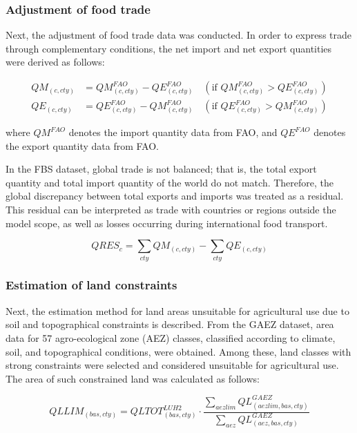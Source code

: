 \subsubsection{Adjustment of food trade}

Next, the adjustment of food trade data was conducted. 
In order to express trade through complementary conditions, 
the net import and net export quantities were derived as follows:

\begin{align}
QM_{(c,cty)} &= QM^{FAO}_{(c,cty)} - QE^{FAO}_{(c,cty)} 
\quad (\text{if } QM^{FAO}_{(c,cty)} > QE^{FAO}_{(c,cty)}) \\
QE_{(c,cty)} &= QE^{FAO}_{(c,cty)} - QM^{FAO}_{(c,cty)} 
\quad (\text{if } QE^{FAO}_{(c,cty)} > QM^{FAO}_{(c,cty)})
\end{align}

where \( QM^{FAO} \) denotes the import quantity data from FAO, 
and \( QE^{FAO} \) denotes the export quantity data from FAO.

In the FBS dataset, global trade is not balanced; 
that is, the total export quantity and total import quantity of the world do not match.  
Therefore, the global discrepancy between total exports and imports was treated as a residual.  
This residual can be interpreted as trade with countries or regions 
outside the model scope, as well as losses occurring during international food transport.

\begin{equation}
QRES_{c} = \sum_{cty} QM_{(c,cty)} - \sum_{cty} QE_{(c,cty)}
\end{equation}



\subsubsection{Estimation of land constraints}

Next, the estimation method for land areas unsuitable for agricultural use 
due to soil and topographical constraints is described.  
From the GAEZ dataset, area data for 57 agro-ecological zone (AEZ) classes, 
classified according to climate, soil, and topographical conditions, 
were obtained.  
Among these, land classes with strong constraints were selected 
and considered unsuitable for agricultural use.  
The area of such constrained land was calculated as follows:

\begin{equation}
QLLIM_{(bas,cty)} = 
QLTOT^{LUH2}_{(bas,cty)} \cdot 
\frac{\sum_{aezlim} QL^{GAEZ}_{(aezlim,bas,cty)}}
{\sum_{aez} QL^{GAEZ}_{(aez,bas,cty)}}
\end{equation}

